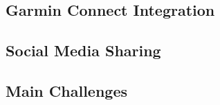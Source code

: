 \subsection{Garmin Connect Integration}
\label{iteration3:garmin-integration}

\subsection{Social Media Sharing}
\label{iteration3:social-sharing}

\subsection{Main Challenges}
\label{iteration3:main-challenges}
